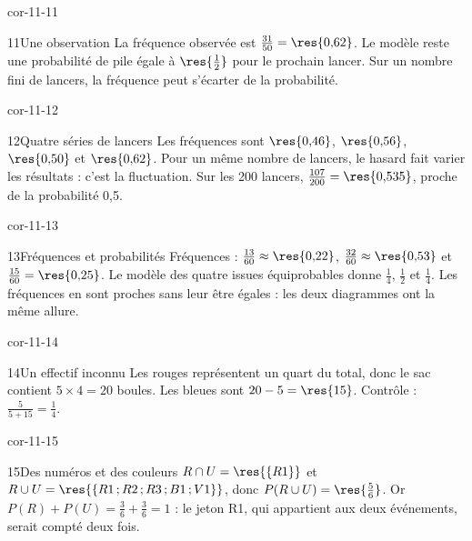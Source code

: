 \begin{blocLivre}{cor-11-11}\begin{corrige}{11}{Une observation}
La fréquence observée est $\frac{31}{50}=\res{0{,}62}$. Le modèle reste une probabilité de pile égale à $\res{\frac12}$ pour le prochain lancer. Sur un nombre fini de lancers, la fréquence peut s’écarter de la probabilité.
\end{corrige}\end{blocLivre}
\begin{blocLivre}{cor-11-12}\begin{corrige}{12}{Quatre séries de lancers}
Les fréquences sont $\res{0{,}46}$, $\res{0{,}56}$, $\res{0{,}50}$ et $\res{0{,}62}$. Pour un même nombre de lancers, le hasard fait varier les résultats : c’est la fluctuation. Sur les 200 lancers, $\frac{107}{200}=\res{0{,}535}$, proche de la probabilité 0,5.
\label{fig-cor-11-12}
\end{corrige}\end{blocLivre}
\begin{blocLivre}{cor-11-13}\begin{corrige}{13}{Fréquences et probabilités}
Fréquences : $\frac{13}{60}\approx\res{0{,}22}$, $\frac{32}{60}\approx\res{0{,}53}$ et $\frac{15}{60}=\res{0{,}25}$. Le modèle des quatre issues équiprobables donne $\frac14$, $\frac12$ et $\frac14$. Les fréquences en sont proches sans leur être égales : les deux diagrammes ont la même allure.
\label{fig-cor-11-13}
\end{corrige}\end{blocLivre}
\begin{blocLivre}{cor-11-14}\begin{corrige}{14}{Un effectif inconnu}
Les rouges représentent un quart du total, donc le sac contient $5\times4=20$ boules. Les bleues sont $20-5=\res{15}$. Contrôle : $\frac5{5+15}=\frac14$.
\end{corrige}\end{blocLivre}
\begin{blocLivre}{cor-11-15}\begin{corrige}{15}{Des numéros et des couleurs}
$R\cap U=\res{\{R1\}}$ et $R\cup U=\res{\{R1\,;R2\,;R3\,;B1\,;V1\}}$, donc $P(R\cup U)=\res{\frac56}$. Or $P(R)+P(U)=\frac36+\frac36=1$ : le jeton R1, qui appartient aux deux événements, serait compté deux fois.
\label{fig-cor-11-15}
\end{corrige}\end{blocLivre}

